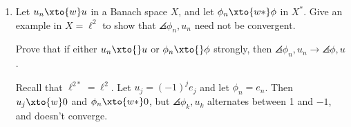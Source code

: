 \documentclass[12pt,letterpaper]{article}
\let\oldphi\phi
\renewcommand{\phi}{\varphi}
\begin{document}
\begin{enumerate}
\begin{proof}
		\textsc{Proof} Let $g\in \dballf{r}$. Then 
		\begin{align}
		\sum_n 2^{-n}|f_n-g_n|&< r, \text{ and} \\
		\sup_n|f_n-g_n|&=2.
		\end{align}		
		So 
		\begin{align*}
		\abs{\angles{(f-g),p}} &= \abs{\sum_{n=1}^\infty (f_n-g_n)(p_n)} \\
		&\leq \sum_{n=1}^\infty |f_n-g_n||p_n| \\
		&= \sum_{1}^N |f_n-g_n||p_n| + \sum_{N}^\infty |f_n-g_n||p_n|\\
		&\leq \sum_{1}^N \frac{2^{-n}}{4r}|f_n-g_n| + \sum_{N}^\infty 2|p_n| &\text{applying (2) and (4)}\\
		&< \frac{1}{2}+\frac{1}{2} &\text{applying (3) and (1)} \\
		&=1
		\end{align*}
Thus every $f\in W(0,p)$ has a $d$-ball containing $f$ which is a subset of $W(0,p)$, so Part I is proved. \qedwhite

\textsc{Part II:} First note that 
$$\norm{f}_d\leq\norm{f}_{\ell^\infty}$$
since, if $f_n$ is an absolutely decreasing sequence, then
$$\sum_n 2^{-n}|f_n|\leq\sup_n|f_n| \quad\text{ (with equality if $f_n$ is constant)},$$
and swapping any coordinates of $f_n$ will cause $\norm{f}_d$ to decrease while $\norm{f}_{\ell^\infty}$ remains constant.

\newcommand{\dball}{\tensor[_d]{B}{_{r}}(f)}
\newcommand{\lball}{\tensor[_{\ell^\infty}]{B}{_{r}}(f)}
Thus the balls $\lball\subset\dball$ whenever they have the same radius and center. This means that for any ball $\dball$ with $g\in\dball$, there is of course some 
$$\tensor[_d]{B}{_{r'}}(g)\subset\dball,$$ 
and 
$$\tensor[_{\ell^\infty}]{B}{_{r'}}(g)\subset \tensor[_d]{B}{_{r'}}(g)$$
so we're done. 
\end{proof}

\pagebreak
\renewcommand{\phi}{\oldphi}
\item Let $u_n\xto{w}u$ in a Banach space $X$, and let $\phi_n\xto{w*}\phi$ in $X^*$. Give an example in $X=\ell^2$ to show that $\angles{\phi_n,u_n}$ need not be convergent. 

Prove that if either  $u_n\xto{}u$ or $\phi_n\xto{}\phi$ strongly, then $\angles{\phi_n,u_n}\to\angles{\phi,u}$.

\begin{example*}
Recall that $\ell^{2*}=\ell^2$. Let $u_j=(-1)^j e_j$ and let $\phi_n=e_n$. Then $u_j\xto{w}0$ and $\phi_n\xto{w*}0$, but $\angles{\phi_k,u_k}$ alternates between 1 and $-1$, and doesn't converge.
\qedwhite


\end{example*}
\end{enumerate}
\end{document}
